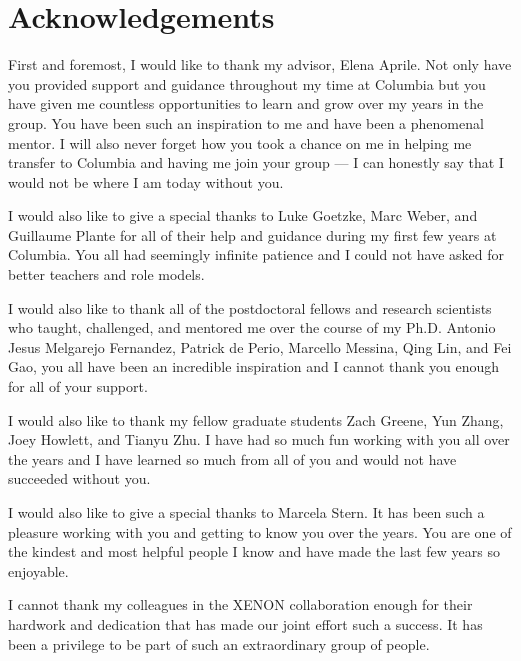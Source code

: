 
\cleartorecto %
\chapter{Acknowledgements} %
\thispagestyle{plain} %



First and foremost, I would like to thank my advisor, Elena Aprile.  Not only have you provided support and guidance throughout my time at Columbia but you have given me countless opportunities to learn and grow over my years in the group.  You have been such an inspiration to me and have been a phenomenal mentor.  I will also never forget how you took a chance on me in helping me transfer to Columbia and having me join your group --- I can honestly say that I would not be where I am today without you.


I would also like to give a special thanks to Luke Goetzke, Marc Weber, and Guillaume Plante for all of their help and guidance during my first few years at Columbia.  You all had seemingly infinite patience and I could not have asked for better teachers and role models.


I would also like to thank all of the postdoctoral fellows and research scientists who taught, challenged, and mentored me over the course of my Ph.D.  Antonio Jesus Melgarejo Fernandez, Patrick de Perio, Marcello Messina, Qing Lin, and Fei Gao, you all have been an incredible inspiration and I cannot thank you enough for all of your support.  


I would also like to thank my fellow graduate students Zach Greene, Yun Zhang, Joey Howlett, and Tianyu Zhu.  I have had so much fun working with you all over the years and I have learned so much from all of you and would not have succeeded without you.  


I would also like to give a special thanks to Marcela Stern.  It has been such a pleasure working with you and getting to know you over the years.  You are one of the kindest and most helpful people I know and have made the last few years so enjoyable.


I cannot thank my colleagues in the XENON collaboration enough for their hardwork and dedication that has made our joint effort such a success.  It has been a privilege to be part of such an extraordinary group of people.


